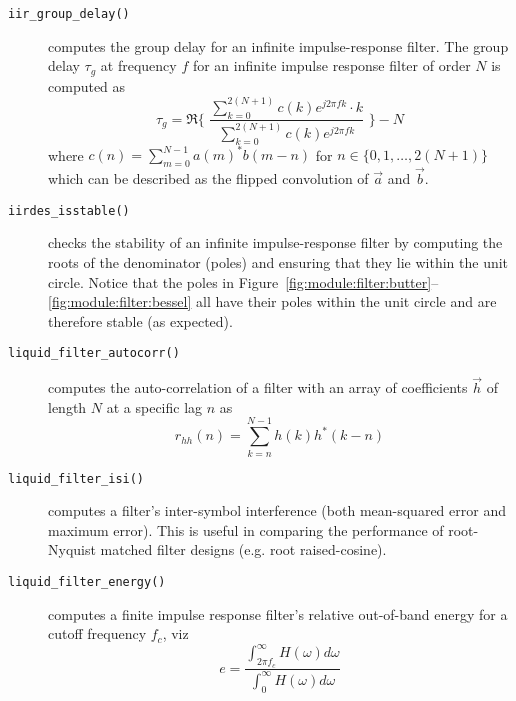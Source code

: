 \begin{description}
\item[{\tt iir\_group\_delay()}]
    computes the group delay for an infinite impulse-response filter.
    The group delay $\tau_g$ at frequency $f$ for an infinite impulse
    response filter of order $N$ is computed as
    \[
        \tau_g = \Re\Biggl\{ \,\,
            \frac{
                \sum_{k=0}^{2(N+1)}{c(k)e^{j 2 \pi f k} \cdot k}
            } {
                \sum_{k=0}^{2(N+1)}{c(k)e^{j 2 \pi f k}}
            }\,\,
            \Biggr\}
            - N
    \]
    where $c(n) = \sum_{m=0}^{N-1}{a(m)^*b(m-n)}$
    for $n \in \{0,1,\ldots,2(N+1)\}$
    which can be described as the flipped convolution of $\vec{a}$ and
    $\vec{b}$.

\item[{\tt iirdes\_isstable()}]
    checks the stability of an infinite impulse-response filter by computing
    the roots of the denominator (poles) and ensuring that they lie within the
    unit circle.
    Notice that the poles in
    Figure~\ref{fig:module:filter:butter}--%
           \ref{fig:module:filter:bessel}
    all have their poles within the unit circle and are therefore stable (as
    expected).

\item[{\tt liquid\_filter\_autocorr()}]
    computes the auto-correlation of a filter with an array of coefficients
    $\vec{h}$ of length $N$ at a specific lag $n$ as
    \[
        r_{hh}(n) = \sum_{k=n}^{N-1} {h(k)h^*(k-n)}
    \]

\item[{\tt liquid\_filter\_isi()}]
    computes a filter's inter-symbol interference (both mean-squared error and
    maximum error).
    This is useful in comparing the performance of root-Nyquist matched filter
    designs (e.g. root raised-cosine).

\item[{\tt liquid\_filter\_energy()}]
    computes a finite impulse response filter's relative out-of-band
    energy for a cutoff frequency $f_c$, viz
    \[
        e =
            \frac{
                \int_{2 \pi f_c}^{\infty}{H(\omega)d\omega}
            } {
                \int_{0}^{\infty}{H(\omega)d\omega}
            }
    \]

\end{description}

